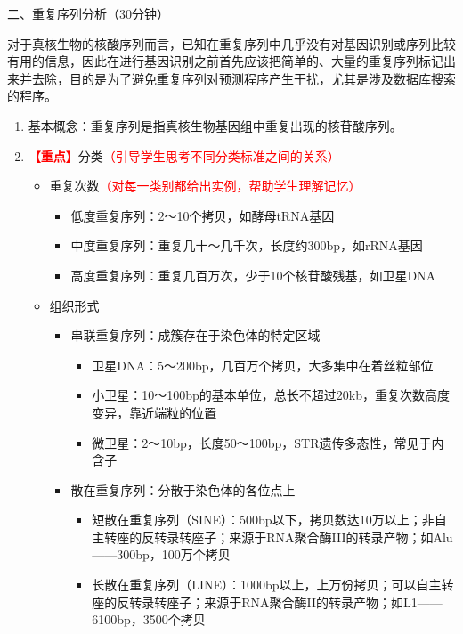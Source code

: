 \documentclass{TIJMUjiaoanLL}
\begin{document}
\vspace*{0.2cm}
\noindent
二、重复序列分析（30分钟）

对于真核生物的核酸序列而言，已知在重复序列中几乎没有对基因识别或序列比较有用的信息，因此在进行基因识别之前首先应该把简单的、大量的重复序列标记出来并去除，目的是为了避免重复序列对预测程序产生干扰，尤其是涉及数据库搜索的程序。
\begin{enumerate}
  \item 基本概念：重复序列是指真核生物基因组中重复出现的核苷酸序列。
  \item \textcolor{red}{\textbf{【重点】}}分类\textcolor{red}{（引导学生思考不同分类标准之间的关系）}
    \begin{itemize}
      \item 重复次数\textcolor{red}{（对每一类别都给出实例，帮助学生理解记忆）}
	\begin{itemize}
	  \item 低度重复序列：2～10个拷贝，如酵母tRNA基因
	  \item 中度重复序列：重复几十～几千次，长度约300bp，如rRNA基因
	  \item 高度重复序列：重复几百万次，少于10个核苷酸残基，如卫星DNA
	\end{itemize}
      \item 组织形式
	\begin{itemize}
	  \item 串联重复序列：成簇存在于染色体的特定区域
	    \begin{itemize}
	      \item 卫星DNA：5～200bp，几百万个拷贝，大多集中在着丝粒部位
	      \item 小卫星：10～100bp的基本单位，总长不超过20kb，重复次数高度变异，靠近端粒的位置
	      \item 微卫星：2～10bp，长度50～100bp，STR遗传多态性，常见于内含子
	    \end{itemize}
	  \item 散在重复序列：分散于染色体的各位点上
	    \begin{itemize}
	      \item 短散在重复序列（SINE）：500bp以下，拷贝数达10万以上；非自主转座的反转录转座子；来源于RNA聚合酶III的转录产物；如Alu——300bp，100万个拷贝
	      \item 长散在重复序列（LINE）：1000bp以上，上万份拷贝；可以自主转座的反转录转座子；来源于RNA聚合酶II的转录产物；如L1——6100bp，3500个拷贝
	    \end{itemize}
	\end{itemize}
    \end{itemize}

\end{enumerate}
\end{document}

